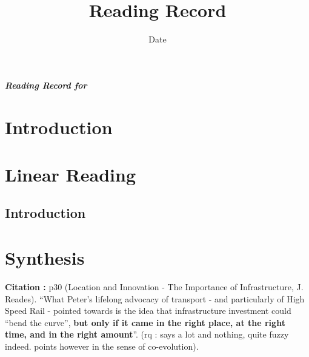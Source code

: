


\title{Reading Record\bigskip\\
\cite{knowles2016sir}
}
\author{}
\date{Date}


\maketitle

\textbf{\textit{Reading Record for \cite{knowles2016sir}}}




\section{Introduction}




\section{Linear Reading}

\subsection{Introduction}





\section{Synthesis}


\textbf{Citation : } p30 (Location and Innovation - The Importance of Infrastructure, J. Reades). ``What Peter's lifelong advocacy of transport - and particularly of High Speed Rail - pointed towards is the idea that infrastructure investment could ``bend the curve'', \textbf{but only if it came in the right place, at the right time, and in the right amount}''. (rq : says a lot and nothing, quite fuzzy indeed. points however in the sense of co-evolution).















